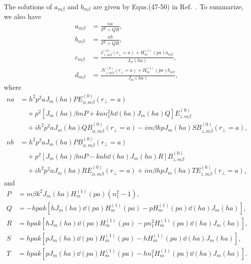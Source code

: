 \documentclass[]{report}
\begin{document}
The solutions of $a_{m\beta}$ and $b_{m\beta}$ are given by Equs.(47-50) in Ref.~\cite{Klimov2004}. To summarize, we also have
\begin{align}
a_{m\beta} &= \frac{na}{P^2+QR},\\
b_{m\beta} &= \frac{nb}{P^2+QR},\\
c_{m\beta} &= \frac{\mathcal{E}_{z,m\beta}^{(0)}(r\!_\perp\!=\!a)+ H_m^{(1)}(pa)a_{m\beta}}{J_m(ha)},\\
d_{m\beta} &= \frac{\mathcal{H}_{z,m\beta}^{(0)}(r\!_\perp\!=\!a)+ H_m^{(1)}(pa)b_{m\beta}}{J_m(ha)},
\end{align}
where
\begin{align}
na &= h^2p^2aJ_m(ha)PE_{\phi,m\beta}^{(0)}(r\!_\perp\!=\!a) \nonumber\\
&\quad + p^2\left[J_m(ha)\beta mP+kan_1^2h \dd{}{(ha)}J_m(ha)Q \right] E_{z,m\beta}^{(0)} \nonumber\\
&\quad + ih^2p^2 aJ_m(ha)QB_{\phi,m\beta}^{(0)}(r\!_\perp\!\!=\!a) \!-\! im\beta hpJ_m(ha)SB_{z,m\beta}^{(0)}(r\!_\perp\!\!=\!a),\\
nb &= h^2p^2aJ_m(ha)PB_{\phi,m\beta}^{(0)}(r\!_\perp\!=\!a) \nonumber\\
&\quad + p^2\left[J_m(ha)\beta mP-kah \dd{}{(ha)}J_m(ha)R \right] B_{z,m\beta}^{(0)} \nonumber\\
&\quad + ih^2p^2 aJ_m(ha)RE_{\phi,m\beta}^{(0)}(r\!_\perp\!\!=\!a) \!+\! im\beta hpJ_m(ha)TE_{z,m\beta}^{(0)}(r\!_\perp\!\!=\!a),
\end{align} 
and
\begin{align}
P &=m\beta k^2J_m(ha)H_m^{(1)}(pa)(n_1^2-1),\\
Q &=-hpak\left[ hJ_m(ha)\dd{}{(pa)}H_m^{(1)}(pa)-pH_m^{(1)}(pa)\dd{}{(ha)}J_m(ha) \right],\\
R &=hpak\left[ hJ_m(ha)\dd{}{(pa)}H_m^{(1)}(pa)-pn_1^2H_m^{(1)}(pa)\dd{}{(ha)}J_m(ha) \right],\\
S &=hpak\left[ pJ_m(ha)\dd{}{(pa)}H_m^{(1)}(pa)-hH_m^{(1)}(pa)\dd{}{(ha)}J_m(ha) \right],\\
T &=hpak\left[ pJ_m(ha)\dd{}{(pa)}H_m^{(1)}(pa)-hn_1^2H_m^{(1)}(pa)\dd{}{(ha)}J_m(ha) \right].
\end{align}
\end{document}
